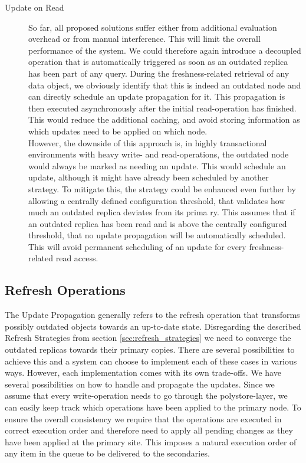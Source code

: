 \begin{description}
    \item[Update on Read] So far, all proposed solutions suffer either from additional evaluation overhead or from manual interference. This will limit the overall 
    performance of the system. We could therefore again introduce a decoupled operation that is automatically triggered as soon as an outdated replica has been part of any query. 
    During the freshness-related retrieval of any data object, we obviously identify that this is indeed an outdated node and can directly schedule an update propagation for it. This propagation is then
    executed asynchronously after the initial read-operation has finished. This would reduce the additional caching, and avoid storing 
    information as which updates need to be applied on which node.\\
    However, the downside of this approach is, in highly transactional environments with heavy write- and read-operations, the outdated node would always be marked as 
    needing an update. This would schedule an update, although it might have already been scheduled by another strategy. 
    To mitigate this, the strategy could be enhanced even further by allowing a centrally defined configuration threshold, that validates how much an outdated replica deviates from its prima
    ry. 
    This assumes that if an outdated replica has been read and is above the centrally configured threshold, that no update propagation will be automatically scheduled.
    This will avoid permanent scheduling of an update for every freshness-related read access.

\end{description}





\subsection{Refresh Operations}
\label{sec:refresh_operations}

The Update Propagation generally refers to the refresh operation that transforms possibly outdated objects towards an up-to-date state.
Disregarding the described Refresh Strategies from section \ref{sec:refresh_strategies} we need to converge the outdated replicas towards their 
primary copies.
There are several possibilities to achieve this and a system can choose to implement each of these cases in various ways. However, each implementation comes with its
own trade-offs.
We have several possibilities on how to handle and propagate the updates.
Since we assume that every write-operation needs to go through the polystore-layer, we can easily keep track which operations have been applied to the primary node.
To ensure the overall consistency we require that the operations are executed in correct execution order and therefore need to apply all pending changes as they have been applied at the primary site.
This imposes a natural execution order of any item in the queue to be delivered to the secondaries.


